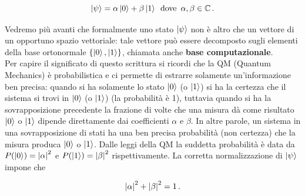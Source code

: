 \begin{equation*}
    \ket{\psi} = \alpha \ket{0} + \beta \ket{1} \, \text{ dove } \, \alpha, \beta \in \mathbb{C} \, .
\end{equation*}

\noindent Vedremo più avanti che formalmente uno stato $\ket{\psi}$ non è altro che un vettore di un opportuno spazio vettoriale: tale vettore può essere decomposto sugli elementi della base ortonormale $\left\lbrace \ket{0}, \ket{1} \right\rbrace$, chiamata anche \textbf{base computazionale}. \\
\noindent Per capire il significato di questo scrittura si ricordi che la QM (Quantum Mechanics) è probabilistica e ci permette di estrarre solamente un'informazione ben precisa: quando si ha solamente lo stato $\ket{0}$ (o $\ket{1}$) si ha la certezza che il sistema si trovi in $\ket{0}$ (o $\ket{1}$) (la probabilità è 1), tuttavia quando si ha la sovrapposizione precedente la frazione di volte che una misura dà come risultato $\ket{0}$ o $\ket{1}$ dipende direttamente dai coefficienti $\alpha$ e $\beta$. In altre parole, un sistema in una sovrapposizione di stati ha una ben precisa probabilità (non certezza) che la misura produca $\ket{0}$ o $\ket{1}$. Dalle leggi della QM la suddetta probabilità è data da $P(\ket{0}) = \abs{\alpha}^2$ e $P(\ket{1}) = \abs{\beta}^2$ rispettivamente. La corretta normalizzazione di $\ket{\psi}$ impone che

\begin{equation*}
    \abs{\alpha}^2 + \abs{\beta}^2 = 1 \, .
\end{equation*}

